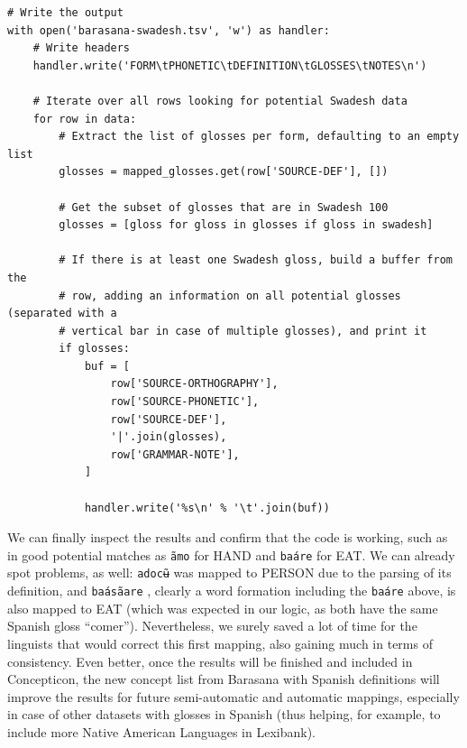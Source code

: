\documentclass[
  a4paper,
  14pt,
  oneside,
  tablecaptionabove
]{scrbook}
\begin{document}
\begin{lstlisting}
# Write the output
with open('barasana-swadesh.tsv', 'w') as handler:
    # Write headers
    handler.write('FORM\tPHONETIC\tDEFINITION\tGLOSSES\tNOTES\n')

    # Iterate over all rows looking for potential Swadesh data
    for row in data:
        # Extract the list of glosses per form, defaulting to an empty list
        glosses = mapped_glosses.get(row['SOURCE-DEF'], [])

        # Get the subset of glosses that are in Swadesh 100
        glosses = [gloss for gloss in glosses if gloss in swadesh]

        # If there is at least one Swadesh gloss, build a buffer from the
        # row, adding an information on all potential glosses (separated with a
        # vertical bar in case of multiple glosses), and print it
        if glosses:
            buf = [
                row['SOURCE-ORTHOGRAPHY'],
                row['SOURCE-PHONETIC'],
                row['SOURCE-DEF'],
                '|'.join(glosses),
                row['GRAMMAR-NOTE'],
            ]

            handler.write('%s\n' % '\t'.join(buf))
\end{lstlisting}

We can finally inspect the results and confirm that the code is working,
such as in good potential matches as \lstinline!ãmo! for
HAND and \lstinline!baáre! for EAT. We can already spot
problems, as well: \lstinline!adocʉ̃! was mapped to PERSON
due to the parsing of its definition, and
\lstinline!baásãare! , clearly a word formation including
the \lstinline!baáre! above, is also mapped to EAT (which
was expected in our logic, as both have the same Spanish gloss
\enquote{comer}). Nevertheless, we surely saved a lot of time for the
linguists that would correct this first mapping, also gaining much in
terms of consistency. Even better, once the results will be finished and
included in Concepticon, the new concept list from Barasana with Spanish
definitions will improve the results for future semi-automatic and
automatic mappings, especially in case of other datasets with glosses in
Spanish (thus helping, for example, to include more Native American
Languages in Lexibank).
\end{document}
